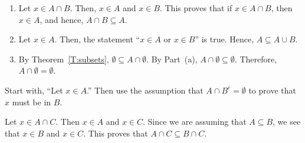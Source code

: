 \begin{list}{\bf{\ref{exer:intersectandunion}.}}
\item \begin{enumerate}
\item Let $x \in A \cap B$.  Then, $x \in A$ and $x \in B$.  This proves that if $x \in A \cap B$, then $x \in A$, and hence, 
$A \cap B \subseteq A$.
\item Let $x \in A$.  Then, the statement ``$x \in A$ or $x \in B$'' is true.  Hence, 
$A \subseteq A \cup B$.
\setcounter{enumi}{4}
\item By Theorem~\ref{T:subsets}, $\emptyset \subseteq A \cap \emptyset$.  By Part~(a), 
$A \cap \emptyset \subseteq \emptyset$.  Therefore, $A \cap \emptyset = \emptyset$.
\end{enumerate}

%
\end{list}

\begin{list}{\bf{\ref{exer:subsetprop}.}}
\item Start with, ``Let $x \in A$.''  Then use the assumption that $A \cap B^c = \emptyset$ to prove that $x$ must be in $B$.
\end{list}

\begin{list}{\bf{\ref{exer:unionandintersect}.}}
\item \begin{list}{\bf{(a)}}
\item Let $x \in A \cap C$.  Then $x \in A$ and $x \in C$.  Since we are assuming that 
$A \subseteq B$, we see that $x \in B$ and $x \in C$.  This proves that \linebreak
$A \cap C \subseteq B \cap C$.
\end{list}
\end{list}



